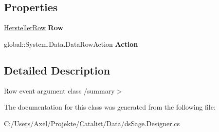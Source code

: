 \subsection*{Properties}
\begin{DoxyCompactItemize}
\item 
\hyperlink{class_products_1_1_data_1_1ds_sage_1_1_hersteller_row}{Hersteller\+Row} {\bfseries Row}\hypertarget{class_products_1_1_data_1_1ds_sage_1_1_hersteller_row_change_event_a381bfaa52daf4af7433190896918e369}{}\label{class_products_1_1_data_1_1ds_sage_1_1_hersteller_row_change_event_a381bfaa52daf4af7433190896918e369}

\item 
global\+::\+System.\+Data.\+Data\+Row\+Action {\bfseries Action}\hypertarget{class_products_1_1_data_1_1ds_sage_1_1_hersteller_row_change_event_a27fce050517b6620616fa3722d24c688}{}\label{class_products_1_1_data_1_1ds_sage_1_1_hersteller_row_change_event_a27fce050517b6620616fa3722d24c688}

\end{DoxyCompactItemize}


\subsection{Detailed Description}
Row event argument class /summary$>$ 

The documentation for this class was generated from the following file\+:\begin{DoxyCompactItemize}
\item 
C\+:/\+Users/\+Axel/\+Projekte/\+Catalist/\+Data/ds\+Sage.\+Designer.\+cs\end{DoxyCompactItemize}
